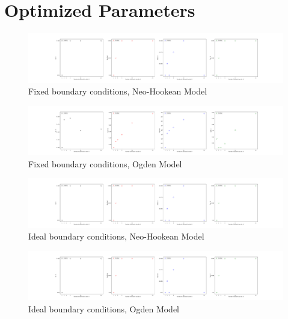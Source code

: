 \documentclass{article}
\begin{document}
\centering

\section{Optimized Parameters}

\begin{figure}[h!]
\centering
\includegraphics[width=1\linewidth, trim= 250 0 250 0]{OptimizedParametersFixedNeo-Hookean}
\caption{Fixed boundary conditions, Neo-Hookean Model}
\end{figure}

\begin{figure}[h!]
\centering
\includegraphics[width=\linewidth, trim= 250 0 250 0]{OptimizedParametersFixedOgden}
\caption{Fixed boundary conditions, Ogden Model}
\end{figure}

\begin{figure}[h!]
\centering
\includegraphics[width=\linewidth, trim= 250 0 250 0]{OptimizedParametersIdealNeo-Hookean}
\caption{Ideal boundary conditions, Neo-Hookean Model}
\end{figure}

\begin{figure}[h!]
\centering
\includegraphics[width=\linewidth, trim= 250 0 250 0]{OptimizedParametersIdealOgden}
\caption{Ideal boundary conditions, Ogden Model}
\end{figure}
\end{document}
